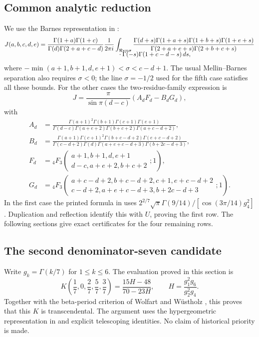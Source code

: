 \documentclass[11pt,a4paper]{article}
\theoremstyle{definition}
\theoremstyle{remark}
\numberwithin{equation}{section}
\newcommand{\F}[2]{{}_{#1}F_{#2}}
\begin{document}
\subsection{Common analytic reduction}
We use the Barnes representation in \cite{extra8-zudilin}:
\begin{align*}
J(a,b,c,d,e)
&=\frac{\Gamma(1+a)\Gamma(1+c)}{\Gamma(d)\Gamma(2+a+c-d)}
\frac1{2\pi i}\int_{\Re s=\sigma}
\frac{\Gamma(d+s)\Gamma(1+a+s)\Gamma(1+b+s)\Gamma(1+e+s)}
 {\Gamma(2+a+e+s)\Gamma(2+b+c+s)}\\[-2mm]
&\hspace{45mm}\cdot\Gamma(-s)\Gamma(1+c-d-s)\,ds,
\end{align*}
where \(-\min(a+1,b+1,d,e+1)<\sigma<c-d+1\).
The usual Mellin--Barnes separation also requires \(\sigma<0\); the
line \(\sigma=-1/2\) used for the fifth case satisfies all these bounds.
For the other cases the two-residue-family expression is
\[
J=\frac{\pi}{\sin\pi(d-c)}(A_dF_d-B_dG_d),
\]
with
\begin{align*}
A_d&=\frac{\Gamma(a+1)^2\Gamma(b+1)\Gamma(c+1)\Gamma(e+1)}
 {\Gamma(d-c)\Gamma(a+e+2)\Gamma(b+c+2)\Gamma(a+c-d+2)},\\
B_d&=\frac{\Gamma(a+1)\Gamma(c+1)^2
 \Gamma(b+c-d+2)\Gamma(e+c-d+2)}
 {\Gamma(c-d+2)\Gamma(d)\Gamma(a+e+c-d+3)\Gamma(b+2c-d+3)},\\
F_d&=\F43\left(\begin{matrix}a+1,b+1,d,e+1\\d-c,a+e+2,b+c+2\end{matrix};1\right),\\
G_d&=\F43\left(\begin{matrix}a+c-d+2,b+c-d+2,c+1,e+c-d+2\\
 c-d+2,a+e+c-d+3,b+2c-d+3\end{matrix};1\right).
\end{align*}
In the first case the printed formula in \cite{extra8-zudilin} uses
\(2^{2/7}\sqrt\pi\Gamma(9/14)/[\cos(3\pi/14)g_4^2]\).
Duplication and reflection identify this with \(U\), proving the first row.
The following sections give exact certificates for the four remaining rows.

\subsection{The second denominator-seven candidate}
\label{extra7-sec:target2}

Write $g_k=\Gamma(k/7)$ for $1\leq k\leq6$.  The evaluation proved
in this section is
\begin{equation}\label{extra7-eq:target2-main}
 K\left(\frac17,0,\frac27,\frac57,\frac37\right)
 =\frac{15H-48}{70-23H},\qquad
 H=\frac{g_1^2g_6}{g_2^2g_4}.
\end{equation}
Together with the beta-period criterion of Wolfart and W\"ustholz
\cite{dbkz-ww}, this proves that this $K$ is transcendental.  The argument
uses the hypergeometric representation in \cite{extra8-zudilin} and explicit
telescoping identities.  No claim of historical priority is made.
\end{document}
